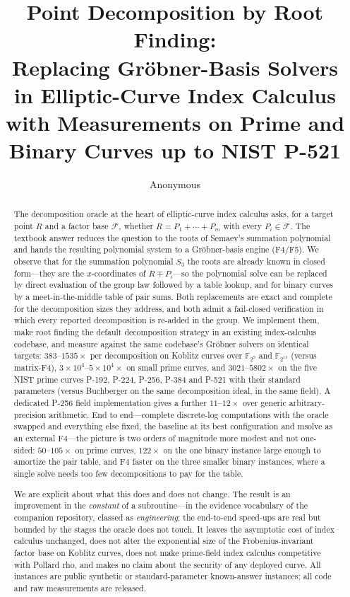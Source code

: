 \documentclass[10pt,a4paper]{article}
\title{Point Decomposition by Root Finding:\\
       Replacing Gr\"obner-Basis Solvers\\
       in Elliptic-Curve Index Calculus\\[4pt]
       {\large with Measurements on Prime and Binary Curves up to NIST P-521}}
\author{Anonymous}
\date{}
\theoremstyle{remark}
\newcommand{\FF}{\mathbb{F}}
\newcommand{\Fb}{\mathcal{F}}
\newcommand{\Sem}[1]{S_{#1}}
\begin{document}
\maketitle

\begin{abstract}
The decomposition oracle at the heart of elliptic-curve index calculus
asks, for a target point $R$ and a factor base $\Fb$, whether
$R = P_1 + \cdots + P_m$ with every $P_i \in \Fb$. The textbook answer
reduces the question to the roots of Semaev's summation polynomial and
hands the resulting polynomial system to a Gr\"obner-basis engine
(F4/F5). We observe that for the summation polynomial $\Sem{3}$ the
roots are already known in closed form---they are the $x$-coordinates of
$R \mp P_i$---so the polynomial solve can be replaced by direct
evaluation of the group law followed by a table lookup, and for binary
curves by a meet-in-the-middle table of pair sums. Both replacements are
exact and complete for the decomposition sizes they address, and both
admit a fail-closed verification in which every reported decomposition
is re-added in the group. We implement them, make root finding the
default decomposition strategy in an existing index-calculus codebase,
and measure against the same codebase's Gr\"obner solvers on identical
targets: $383$--$1535\times$ per decomposition on Koblitz curves over
$\FF_{2^9}$ and $\FF_{2^{13}}$ (versus matrix-F4), $3\times 10^4$--$5\times 10^4\times$
on small prime curves, and $3021$--$5802\times$ on the five NIST prime
curves P-192, P-224, P-256, P-384 and P-521 with their standard
parameters (versus Buchberger on the same decomposition ideal, in the
same field). A dedicated P-256 field implementation gives a further
$11$--$12\times$ over generic arbitrary-precision arithmetic. End to
end---complete discrete-log computations with the oracle swapped and
everything else fixed, the baseline at its best configuration and
msolve as an external F4---the picture is two orders of magnitude more
modest and not one-sided: $50$--$105\times$ on prime curves, $122\times$ on
the one binary instance large enough to amortize the pair table, and F4
faster on the three smaller binary instances, where a single solve
needs too few decompositions to pay for the table.

We are explicit about what this does and does not change. The result is
an improvement in the \emph{constant} of a subroutine---in the evidence
vocabulary of the companion repository, classed as \emph{engineering};
the end-to-end speed-ups are real but bounded by the stages the oracle
does not touch. It leaves the
asymptotic cost of index calculus unchanged, does not alter the
exponential size of the Frobenius-invariant factor base on Koblitz
curves, does not make prime-field index calculus competitive with
Pollard rho, and makes no claim about the security of any deployed
curve. All instances are public synthetic or standard-parameter
known-answer instances; all code and raw measurements are released.
\end{abstract}
\end{document}
